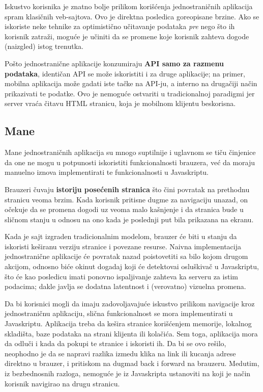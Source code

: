 Iskustvo korisnika je znatno bolje prilikom korišćenja jednostraničnih aplikacija spram klasičnih veb-sajtova.
Ovo je direktna posledica goreopisane brzine.
Ako se iskoriste neke tehnike za optimistično učitavanje podataka \textit{pre} nego što ih korisnik zatraži, moguće je učiniti da se promene koje korisnik zahteva dogode (naizgled) istog trenutka.

Pošto jednostranične aplikacije konzumiraju \textbf{API samo za razmenu podataka}, identičan API se može iskoristiti i za druge aplikacije; na primer, mobilna aplikacija može gadati iste tačke na API-ju, a interno na drugačiji način prikazivati te podatke.
Ovo je nemoguće ostvariti u tradicionalnoj paradigmi jer server vraća čitavu HTML stranicu, koja je mobilnom klijentu beskorisna.

\subsection{Mane}

Mane jednostraničnih aplikacija su mnogo suptilnije i uglavnom se tiču činjenice da one ne mogu u potpunosti iskoristiti funkcionalnosti brauzera, već da moraju manuelno iznova implementirati te funkcionalnosti u Javaskriptu.

Brauzeri čuvaju \textbf{istoriju posećenih stranica} što čini povratak na prethodnu stranicu veoma brzim.
Kada korisnik pritisne dugme za navigaciju unazad, on očekuje da se promena dogodi uz veoma malo kašnjenje i da stranica bude u sličnom stanju u odnosu na ono kada je poslednji put bila prikazana na ekranu.

Kada je sajt izgraden tradicionalnim modelom, brauzer će biti u stanju da iskoristi keširanu verziju stranice i povezane resurse.
Naivna implementacija jednostranične aplikacije će povratak nazad poistovetiti sa bilo kojom drugom akcijom, odnosno biće okinut dogadaj koji će detektovai osluškivač u Javaskriptu, što će kao posledicu imati ponovno ispaljivanje zahteva ka serveru za istim podacima; dakle javlja se dodatna latentnost i (verovatno) vizuelna promena.

Da bi korisnici mogli da imaju zadovoljavajuće iskustvo prilikom navigacije kroz jednostraničnu aplikaciju, slična funkcionalnost se mora implementirati u Javaskriptu. Aplikacija treba da kešira stranice korišćenjem memorije, lokalnog skladišta, baze podataka na strani klijenta ili kolačića.
Sem toga, aplikacija mora da odluči i kada da pokupi te stranice i iskoristi ih.
Da bi se ovo rešilo, neophodno je da se napravi razlika izmedu klika na link ili kucanja adrese direktno u brauzer, i pritiskom na dugmad back i forward na brauzeru. 
Medutim, iz bezbednosnih razloga, nemoguće je iz Javaskripta ustanoviti na koji je način korisnik navigirao na drugu stranicu.

